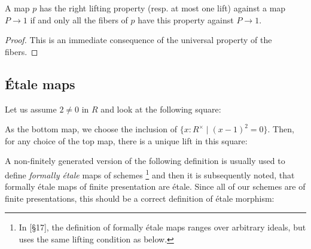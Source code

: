 \begin{lemma}
\label{lifting-defined-fiberwise}
A map $p$ has the right lifting property (resp. at most one lift) against a map $P\to 1$ if and only all the fibers of $p$ have this property against $P\to 1$.
\end{lemma}

\begin{proof}
This is an immediate consequence of the universal property of the fibers.
\end{proof}

\subsection{\'Etale maps}

\begin{example}
  Let us assume $2\neq 0$ in $R$ and look at the following square:
  \begin{center}
  \end{center}
  As the bottom map, we choose the inclusion of $\{x:R^\times \mid (x-1)^2=0 \}$.
  Then, for any choice of the top map, there is a unique lift in this square:
  \begin{center}
  \end{center}
\end{example}

A non-finitely generated version of the following definition is usually used
to define \emph{formally étale} maps of schemes
\footnote{In \cite{EGAIV3}[§17], the definition of formally étale maps ranges over arbitrary ideals, but uses the same lifting condition as below.}
and then it is subsequently noted,
that formally étale maps of finite presentation are étale.
Since all of our schemes are of finite presentations, this should be a correct definition of étale morphism:

